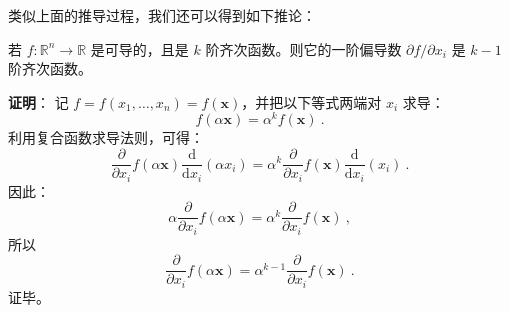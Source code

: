 类似上面的推导过程，我们还可以得到如下推论：
\begin{corollary}{}
若 $f:\mathbb{R}^n \to \mathbb{R}$ 是可导的，且是 $ k $ 阶齐次函数。则它的一阶偏导数 $\partial f/\partial x_i$ 是 $k-1$ 阶齐次函数。
\end{corollary}
\textbf{证明}： 记 $ f=f(x_{1},\ldots ,x_{n})=f(\mathbf {x} )$，并把以下等式两端对 $x_{i}$ 求导：
\begin{equation}
f(\alpha \mathbf {x} )=\alpha ^{k}f(\mathbf {x} )~.
\end{equation}
利用复合函数求导法则，可得：
\begin{equation}
\frac {\partial }{\partial x_{i}}f(\alpha \mathbf {x} ){\frac {\mathrm {d} }{\mathrm {d} x_{i}}}(\alpha x_{i})=\alpha ^{k}{\frac {\partial }{\partial x_{i}}}f(\mathbf {x} ){\frac {\mathrm {d} }{\mathrm {d} x_{i}}}(x_{i})~.
\end{equation}
因此：
\begin{equation}
\alpha {\frac {\partial }{\partial x_{i}}}f(\alpha \mathbf {x} )=\alpha ^{k}{\frac {\partial }{\partial x_{i}}}f(\mathbf {x} )~,
\end{equation}
所以
\begin{equation}
{\frac {\partial }{\partial x_{i}}}f(\alpha \mathbf {x} )=\alpha ^{k-1}{\frac {\partial }{\partial x_{i}}}f(\mathbf {x} )~.
\end{equation}
证毕。

